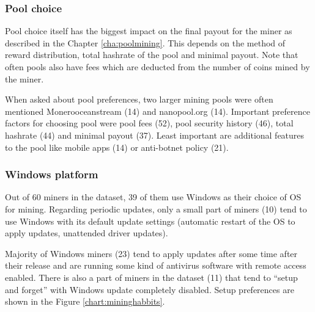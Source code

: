 \documentclass[
  printed, %
  table,   %
  lof,     %
  lot,     %
           oneside, color
]{fithesis3}
\begin{document}
\subsubsection{Pool choice}
Pool choice itself has the biggest impact on the final payout for the miner as described in the Chapter \ref{cha:poolmining}. This depends on the method of reward distribution, total hashrate of the pool and minimal payout. Note that often pools also have fees which are deducted from the number of coins mined by the miner.

When asked about pool preferences, two larger mining pools were often mentioned Monerooceanstream (14) and nanopool.org (14). Important preference factors for choosing pool were pool fees (52), pool security history (46), total hashrate (44) and minimal payout (37). Least important are additional features to the pool like mobile apps (14) or anti-botnet policy (21).
\subsubsection{Windows platform}
Out of 60 miners in the dataset, 39 of them use Windows as their choice of OS for mining. Regarding periodic updates, only a small part of miners (10) tend to use Windows with its default update settings (automatic restart of the OS to apply updates, unattended driver updates). 

Majority of Windows miners (23) tend to apply updates after some time after their release and are running some kind of antivirus software with remote access enabled. There is also a part of miners in the dataset (11) that tend to \enquote{setup and forget} with Windows update completely disabled. Setup preferences are shown in the Figure \ref{chart:mininghabbits}.
\end{document}
